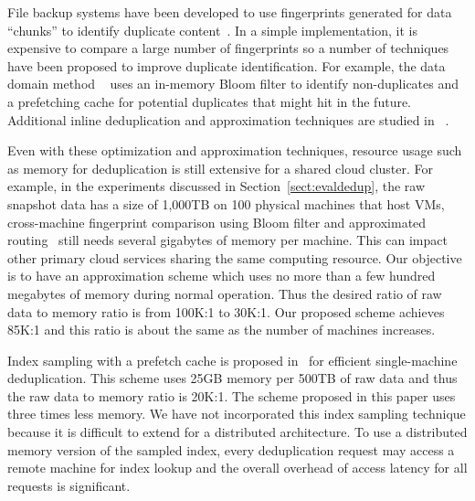 File backup systems have been developed to use fingerprints generated for
data ``chunks''  to identify duplicate
content~\cite{venti02,Rhea2008}.  In a simple implementation,
it is expensive to compare a large number of 
fingerprints
so a number of techniques have been proposed to improve duplicate identification. 
For example, the data domain method ~\cite{bottleneck08} 
uses an in-memory Bloom filter to identify non-duplicates and a prefetching cache for potential
duplicates that might hit in the future.
Additional inline deduplication and  approximation techniques
are studied in ~\cite{extreme_binning09,sparseindex09,Srinivasan2012,WeiZhangIEEE}.  

Even with these optimization and approximation techniques, resource usage such as memory  for deduplication
is still extensive for a shared cloud cluster.  
For example, in the experiments discussed in Section~\ref{sect:evaldedup}, 
the raw snapshot data has a size of 1,000TB on 100 physical machines that host VMs,
cross-machine fingerprint comparison using Bloom filter and approximated routing~\cite{bottleneck08,Dong2011} 
still needs several gigabytes of memory per machine. This can impact other primary cloud services sharing the same
computing resource. Our objective is to have an approximation scheme 
which uses no more than a few hundred megabytes of memory during normal operation.
Thus the  desired ratio of raw data to memory ratio is from 100K:1 to 30K:1.
Our proposed scheme achieves 85K:1
and this ratio is about the same as the number of machines increases.

Index sampling with a prefetch cache  is proposed 
in~\cite{Guo2011} for efficient single-machine deduplication. 
This scheme uses 25GB memory per 500TB of raw data
and thus the raw data to memory ratio is 20K:1. The scheme proposed in this paper 
uses three times less memory. We have not incorporated this index 
sampling technique because it is difficult to extend 
for a distributed architecture.  To use a distributed memory version 
of the sampled index, every deduplication
request may access a remote machine for index lookup and the overall overhead 
of access latency for all requests is significant.

